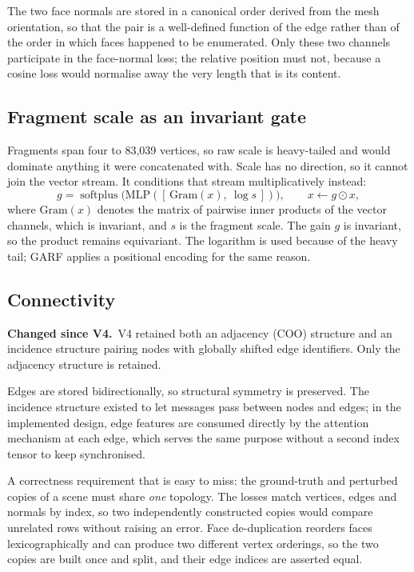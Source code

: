 \documentclass[11pt,a4paper]{report}
\newcommand{\change}[1]{\par\vspace{2pt}\noindent\textcolor{soft}{\small\textbf{Changed since V4.}\ #1}\par\vspace{2pt}}
\begin{document}
The two face normals are stored in a canonical order derived from the mesh
orientation, so that the pair is a well-defined function of the edge rather than
of the order in which faces happened to be enumerated. Only these two channels
participate in the face-normal loss; the relative position must not, because a
cosine loss would normalise away the very length that is its content.

\subsection{Fragment scale as an invariant gate}
\label{sub:scale}

Fragments span four to 83{,}039 vertices, so raw scale is heavy-tailed and would
dominate anything it were concatenated with. Scale has no direction, so it
cannot join the vector stream. It conditions that stream multiplicatively
instead:
\[
g = \operatorname{softplus}\!\big(\mathrm{MLP}([\,\mathrm{Gram}(x),\ \log s\,])\big),
\qquad x \leftarrow g \odot x ,
\]
where $\mathrm{Gram}(x)$ denotes the matrix of pairwise inner products of the
vector channels, which is invariant, and $s$ is the fragment scale. The gain $g$
is invariant, so the product remains equivariant. The logarithm is used because
of the heavy tail; GARF applies a positional encoding for the same reason.

\subsection{Connectivity}
\label{sub:connectivity}

\change{V4 retained both an adjacency (COO) structure and an incidence
structure pairing nodes with globally shifted edge identifiers. Only the
adjacency structure is retained.}

Edges are stored bidirectionally, so structural symmetry is preserved. The
incidence structure existed to let messages pass between nodes and edges; in the
implemented design, edge features are consumed directly by the attention
mechanism at each edge, which serves the same purpose without a second index
tensor to keep synchronised.

A correctness requirement that is easy to miss: the ground-truth and perturbed
copies of a scene must share \emph{one} topology. The losses match vertices,
edges and normals by index, so two independently constructed copies would
compare unrelated rows without raising an error. Face de-duplication reorders
faces lexicographically and can produce two different vertex orderings, so the
two copies are built once and split, and their edge indices are asserted equal.
\end{document}
